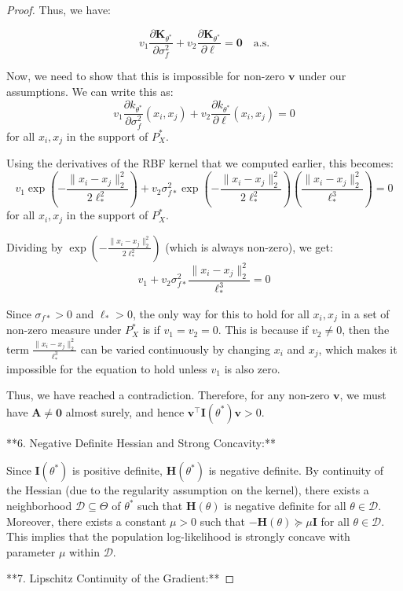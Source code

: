 \begin{proof}
Thus, we have:

$$
v_1 \frac{\partial \mathbf{K}_{\theta^*}}{\partial \sigma_f^2} + v_2 \frac{\partial \mathbf{K}_{\theta^*}}{\partial \ell} = \mathbf{0} \quad \text{a.s.}
$$

Now, we need to show that this is impossible for non-zero $\mathbf{v}$ under our assumptions. We can write this as:
$$
v_1 \frac{\partial k_{\theta^*}}{\partial \sigma_f^2}(x_i,x_j) + v_2 \frac{\partial k_{\theta^*}}{\partial \ell}(x_i,x_j) = 0
$$
for all $x_i,x_j$ in the support of $P_X^*$.

Using the derivatives of the RBF kernel that we computed earlier, this becomes:
$$
v_1 \exp\left(-\frac{\|x_i - x_j\|_2^2}{2\ell_*^2}\right) + v_2 \sigma_{f*}^2 \exp\left(-\frac{\|x_i - x_j\|_2^2}{2\ell_*^2}\right) \left(\frac{\|x_i - x_j\|_2^2}{\ell_*^3}\right) = 0
$$
for all $x_i, x_j$ in the support of $P_X^*$.

Dividing by $\exp\left(-\frac{\|x_i - x_j\|_2^2}{2\ell_*^2}\right)$ (which is always non-zero), we get:
$$
v_1 + v_2 \sigma_{f*}^2 \frac{\|x_i - x_j\|_2^2}{\ell_*^3} = 0
$$

Since $\sigma_{f*} > 0$ and $\ell_* > 0$, the only way for this to hold for all $x_i, x_j$ in a set of non-zero measure under $P^*_X$ is if $v_1 = v_2 = 0$.
This is because if $v_2 \neq 0$, then the term $\frac{\|x_i - x_j\|_2^2}{\ell_*^3}$ can be varied continuously by changing $x_i$ and $x_j$, which makes it impossible for the equation to hold unless $v_1$ is also zero.

Thus, we have reached a contradiction. Therefore, for any non-zero $\mathbf{v}$, we must have $\mathbf{A} \neq \mathbf{0}$ almost surely, and hence $\mathbf{v}^\top \mathbf{I}(\theta^*) \mathbf{v} > 0$.

**6. Negative Definite Hessian and Strong Concavity:**

Since $\mathbf{I}(\theta^*)$ is positive definite, $\mathbf{H}(\theta^*)$ is negative definite. By continuity of the Hessian (due to the regularity assumption on the kernel), there exists a neighborhood $\mathcal{D} \subseteq \Theta$ of $\theta^*$ such that $\mathbf{H}(\theta)$ is negative definite for all $\theta \in \mathcal{D}$. Moreover, there exists a constant $\mu > 0$ such that $-\mathbf{H}(\theta) \succeq \mu \mathbf{I}$ for all $\theta \in \mathcal{D}$. This implies that the population log-likelihood is strongly concave with parameter $\mu$ within $\mathcal{D}$.

**7. Lipschitz Continuity of the Gradient:**


\end{proof}
